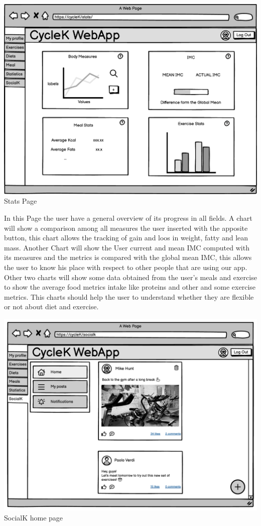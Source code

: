 \begin{center}
\includegraphics[scale=0.47]{Resources/Mockup/Stats.pdf}\\
Stats Page
\end{center}
In this Page the user have a general overview of its progress in all fields. A chart will show a comparison among all measures the user inserted with the apposite button, this chart allows the tracking of gain and loos in weight, fatty and lean mass. Another Chart will show the User current and mean IMC computed with its measures and the metrics is compared with the global mean IMC, this allows the user to know his place with respect to other people that are using our app.
Other two charts will show some data obtained from the user's meals and exercise to show the average food metrics intake like proteins and other and some exercise metrics. This charts should help the user to understand whether they are flexible or not about diet and exercise.

\begin{center}
\includegraphics[scale=0.47]{Resources/Mockup/socialk_home.pdf}\\
SocialK home page
\end{center}

